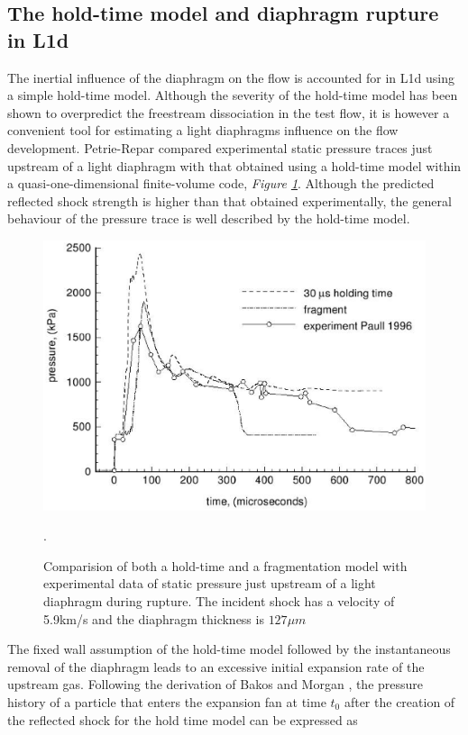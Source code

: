 \documentclass[a4paper,10pt]{article}
\begin{document}
\subsection{The hold-time model and diaphragm rupture in L1d}

The inertial influence of the diaphragm on the flow is accounted for in L1d using a simple hold-time model.  Although the severity of the hold-time model has been shown to overpredict the freestream dissociation in the test flow\cite{bakos,wilson}, it is however a convenient tool for estimating a light diaphragms influence on the flow development.  Petrie-Repar \cite{petrie} compared experimental static pressure traces just upstream of a light diaphragm with that obtained using a hold-time model within a quasi-one-dimensional finite-volume code, \emph{Figure \ref{fig:petrie_holdtime}}.  Although the predicted reflected shock strength is higher than that obtained experimentally, the general behaviour of the pressure trace is well described by the hold-time model.

\begin{figure}
\centering
\includegraphics[scale=0.85]{figs/petrie_holdtime.eps}
\caption{Comparision of both a hold-time and a fragmentation model with experimental data of static pressure just upstream of a light diaphragm during rupture.  The incident shock has a velocity of 5.9km/s and the diaphragm thickness is $127\mu m$\cite{petrie}}.
\label{fig:petrie_holdtime}
\end{figure}

\par \medskip

The fixed wall assumption of the hold-time model followed by the instantaneous removal of the diaphragm leads to an excessive initial expansion rate of the upstream gas.  Following the derivation of Bakos and Morgan \cite{bakos}, the pressure history of a particle that enters the expansion fan at time $t_{0}$ after the
creation of the reflected shock for the hold time model can be expressed as
\end{document}
